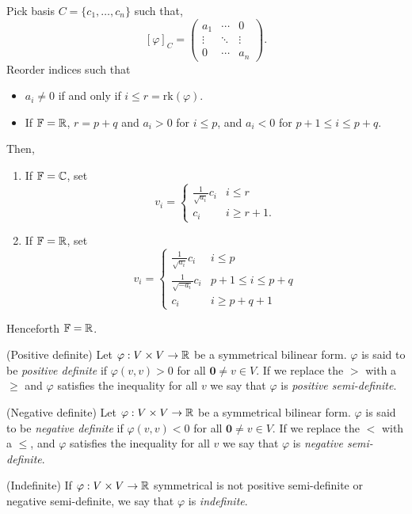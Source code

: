 \documentclass{article}
\newcommand{\F}{\mathbb{F}}
\newcommand{\rk}{\mathrm{rk}}
\begin{document}
\pf Pick basis $ C=\{c_1,\dots, c_n\} $ such that,
\[
	[\varphi]_C=\begin{pmatrix}
		a_1 & \cdots & 0 \\
		\vdots & \ddots & \vdots \\
		0 & \cdots & a_n
	\end{pmatrix}.
\]
Reorder indices such that
\begin{itemize}
	\item $ a_i\ne 0 $ if and only if $ i\le r=\rk(\varphi) $.
	\item If $ \F=\R $, $ r=p+q $ and $ a_i>0 $ for $ i\le p $, and $ a_i<0 $ for $ p+1\le i \le p+q $.
\end{itemize}
Then,
\begin{enumerate}
	\item If $ \F=\C $, set
		\[
		  v_i=\begin{cases}
			  \frac{1}{\sqrt{a_i}}c_i & i \le r \\
				  c_i & i\ge r+1.
		  \end{cases}
		\]
	\item If $ \F=\R $, set
		\[
		  v_i=\begin{cases}
			  \frac{1}{\sqrt{a_i}}c_i & i \le p \\
			  \frac 1{\sqrt{-a_i}}c_i & p+1 \le i \le p+q\\
			  c_i & i\ge p+q+1
		  \end{cases}
		\]
\end{enumerate}
Henceforth $ \F=\R $.
\begin{definition}
	(Positive definite) Let $ \varphi:V\times V\to \mathbb{R} $ be a symmetrical bilinear form. $ \varphi $ is said to be \textit{positive definite} if $ \varphi(v,v)>0 $ for all $ \mathbf 0 \ne v\in V $. If we replace the $ > $ with a $ \ge $ and $ \varphi $ satisfies the inequality for all $ v $ we say that $ \varphi $ is \textit{positive semi-definite}.
\end{definition}
\begin{definition}
	(Negative definite) Let $ \varphi:V\times V\to \mathbb{R} $ be a symmetrical bilinear form. $ \varphi $ is said to be \textit{negative definite} if $ \varphi(v,v)<0 $ for all $ \mathbf 0 \ne v\in V $. If we replace the $ < $ with a $ \le $, and $ \varphi $ satisfies the inequality for all $ v $ we say that $ \varphi $ is \textit{negative semi-definite}.
\end{definition}
\begin{definition}
	(Indefinite) If $ \varphi:V\times V\to \mathbb{R} $ symmetrical is not positive semi-definite or negative semi-definite, we say that $ \varphi $ is \textit{indefinite}.
\end{definition}
\end{document}
